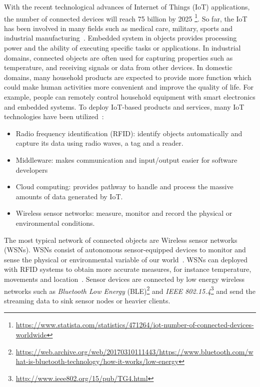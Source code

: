 With the recent technological advances of Internet of Things (IoT) applications,
the number of connected devices will reach 75 billion by 2025
\footnote{\url{https://www.statista.com/statistics/471264/iot-number-of-connected-devices-worldwide}}.
So far, the IoT has been involved in many fields such as medical care, military,
sports and industrial manufacturing~\cite{boudargham2017exhaustive,
lai2013survey, da2014internet}. Embedded system in objects provides processing
power and the ability of executing specific tasks or applications. In industrial
domains, connected objects are often used for capturing properties such as
temperature, and receiving signals or data from other devices. In domestic
domains, many household products are expected to provide more function which
could make human activities more convenient and improve the quality of life. For
example, people can remotely control household equipment with smart electronics
and embedded systems.  To deploy IoT-based products and services, many IoT
technologies have been utilized~\cite{lee2015internet}:
\begin{itemize}
    \item Radio frequency identification (RFID): identify objects automatically
    and capture its data using radio waves, a tag and a reader.
    \item Middleware: makes communication and input/output easier for software
    developers
    \item Cloud computing: provides pathway to handle and process the massive
    amounts of data generated by IoT.
    \item Wireless sensor networks: measure, monitor and record the physical
    or environmental conditions.
\end{itemize}

The most typical network of connected objects are Wireless sensor networks
(WSNs). WSNs consist of autonomous sensor-equipped devices to monitor and sense
the physical or environmental variable of our world~\cite{lee2015internet,
li2016temporal}. WSNs can deployed with RFID systems to obtain more accurate
measures, for instance temperature, movements and
location~\cite{lee2015internet, atzori2010b}. Sensor devices are connected by
low energy wireless networks such as \emph{Bluetooth Low Energy}
(BLE)\footnote{\url{https://web.archive.org/web/20170310111443/https://www.bluetooth.com/what-is-bluetooth-technology/how-it-works/low-energy}}
and \emph{IEEE 802.15.4}\footnote{\url{http://www.ieee802.org/15/pub/TG4.html}}
and send the streaming data to sink sensor nodes or heavier clients.

